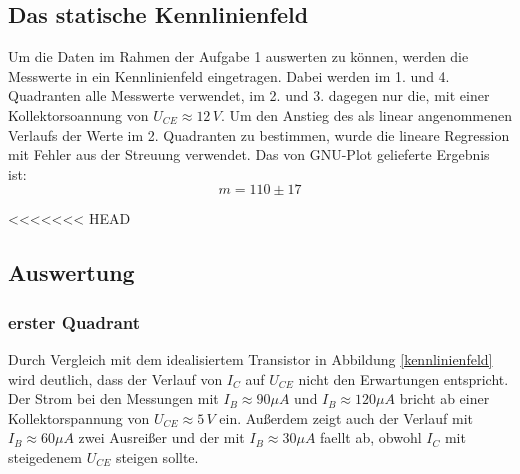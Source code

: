 \subsection{Das statische Kennlinienfeld}
Um die Daten im Rahmen der Aufgabe 1 auswerten zu können, werden die Messwerte in ein Kennlinienfeld eingetragen. Dabei werden im 1. und 4. Quadranten alle Messwerte verwendet, im 2. und 3. dagegen nur die, mit einer Kollektorsoannung von \(U_{CE} \approx 12\,V \). Um den Anstieg des als linear angenommenen Verlaufs der Werte im 2. Quadranten zu bestimmen, wurde die lineare Regression mit Fehler aus der Streuung verwendet. Das von GNU-Plot gelieferte Ergebnis ist:
\begin{equation}
m = 110 \pm 17
\end{equation}
\begin{center}
\begin{minipage}{\linewidth}
\centering
{}
%
\label{gnuplot_kennlinienfeld}
\end{minipage}
\end{center}
<<<<<<< HEAD
\subsection{Auswertung}
\subsubsection{erster Quadrant}
Durch Vergleich mit dem idealisiertem Transistor in Abbildung \ref{kennlinienfeld} wird deutlich, dass der Verlauf von \(I_C\) auf \(U_{CE}\) nicht den Erwartungen entspricht. Der Strom bei den Messungen mit \(I_B \approx 90 \mu A\) und \(I_B \approx 120 \mu A\) bricht ab einer Kollektorspannung von \(U_{CE} \approx 5\, V\) ein. Außerdem zeigt auch der Verlauf mit \(I_B \approx 60 \mu A\) zwei Ausreißer und der mit \(I_B \approx 30 \mu A\) faellt ab, obwohl \(I_C\) mit steigedenem \(U_{CE}\) steigen sollte.
